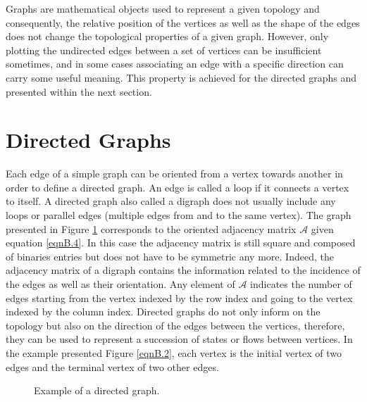 Graphs are mathematical objects used to represent a given topology and consequently, the relative position of the vertices as well as the shape of the edges does not change the topological properties of a given graph. However, only plotting the undirected edges between a set of vertices can be insufficient sometimes, and in some cases associating an edge with a specific direction can carry some useful meaning. This property is achieved for the directed graphs and presented within the next section.

\section{Directed Graphs}

Each edge of a simple graph can be oriented from a vertex towards another in order to define a directed graph. An edge is called a loop if it connects a vertex to itself. A directed graph also called a digraph does not usually include any loops or parallel edges (multiple edges from and to the same vertex). The graph presented in Figure \ref{figB.2} corresponds to the oriented adjacency matrix $\mathcal{A}$ given equation \eqref{eqnB.4}. In this case the adjacency matrix is still square and composed of binaries entries but does not have to be symmetric any more. Indeed, the adjacency matrix of a digraph contains the information related to the incidence of the edges as well as their orientation. Any element of $\mathcal{A}$ indicates the number of edges starting from the vertex indexed by the row index and going to the vertex indexed by the column index. Directed graphs do not only inform on the topology but also on the direction of the edges between the vertices, therefore, they can be used to represent a succession of states or flows between vertices. In the example presented Figure \ref{eqnB.2}, each vertex is the initial vertex of two edges and the terminal vertex of two other edges.

\begin{figure}[!htbp]
\centering
{}
\caption{Example of a directed graph.}
\label{figB.2}
\end{figure}


